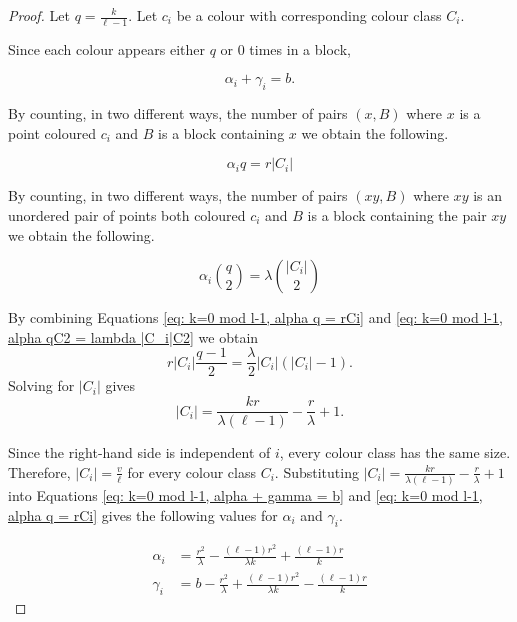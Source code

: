 \documentclass[10pt,a4paper]{amsart}
\begin{document}
\begin{proof}

Let $q = \frac{k}{\ell - 1}$. Let $c_i$ be a colour with corresponding colour class $C_i$.

Since each colour appears either $q$ or $0$ times in a block,

\begin{equation}\label{eq: k=0 mod l-1, alpha + gamma = b}
    \alpha_i + \gamma_i = b.
\end{equation}

By counting, in two different ways, the number of pairs $(x,B)$ where $x$ is a point coloured $c_i$ and $B$ is a block containing $x$ we obtain the following.

\begin{equation}\label{eq: k=0 mod l-1, alpha q = rCi}
    \alpha_i q = r|C_i|
\end{equation}

By counting, in two different ways, the number of pairs $(xy, B)$ where $xy$ is an unordered pair of points both coloured $c_i$ and $B$ is a block containing the pair $xy$ we obtain the following.

\begin{equation}\label{eq: k=0 mod l-1, alpha qC2 = lambda |C_i|C2}
    \alpha_i \binom{q}{2} = \lambda \binom{|C_i|}{2}
\end{equation}

By combining Equations \eqref{eq: k=0 mod l-1, alpha q = rCi} and \eqref{eq: k=0 mod l-1, alpha qC2 = lambda |C_i|C2} we obtain \[r|C_i| \frac{q-1}{2} = \frac{\lambda}{2}|C_i| (|C_i| - 1).\] Solving for $|C_i|$ gives 
\begin{equation}\label{eq: formula for |Ci| in terms of krlambda}
    |C_i| = \frac{kr}{\lambda (\ell -1)} - \frac{r}{\lambda} + 1.
\end{equation}

Since the right-hand side is independent of $i$, every colour class has the same size. Therefore, $|C_i| = \frac{v}{\ell}$ for every colour class $C_i$. Substituting $|C_i| = \frac{kr}{\lambda (\ell -1)} - \frac{r}{\lambda} + 1$ into Equations \eqref{eq: k=0 mod l-1, alpha + gamma = b} and \eqref{eq: k=0 mod l-1, alpha q = rCi} gives the following values for $\alpha_i$ and $\gamma_i$.

\begin{align}
    \alpha_i &= \frac{r^2}{\lambda} - \frac{(\ell - 1) r^2}{\lambda k} + \frac{(\ell - 1)r}{k} \label{eq: alpha formula} \\
    \gamma_i &= b - \frac{r^2}{\lambda} + \frac{(\ell - 1) r^2}{\lambda k} - \frac{(\ell - 1)r}{k} \label{eq: gamma formula}
\end{align}

\end{proof}
\end{document}

